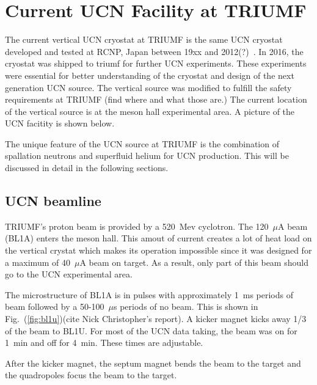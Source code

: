 \chapter{Current UCN Facility at TRIUMF}

The current vertical UCN cryostat at TRIUMF is the same UCN cryostat
developed and tested at RCNP, Japan between 19xx and
2012(?)~\cite{masuda2002spallation,masuda2012spallation}.  In 2016,
the cryostat was shipped to triumf for further UCN experiments. These
experiments were essential for better understanding of the cryostat
and design of the next generation UCN source.  The vertical source was
modified to fulfill the safety requirements at TRIUMF (find where and
what those are.)  The current location of the vertical source is at
the meson hall experimental area.  A picture of the UCN facitity is
shown below.

The unique feature of the UCN source at TRIUMF is the combination of
spallation neutrons and superfluid helium for UCN production. This
will be discussed in detail in the following sections.

\section{UCN beamline}
TRIUMF's proton beam is provided by a 520~Mev cyclotron. The
120~$\mu$A beam (BL1A) enters the meson hall. This amout of current
creates a lot of heat load on the vertical crystat which makes its
operation impossible since it was designed for a maximum of 40~$\mu$A
beam on target. As a result, only part of this beam should go to the UCN
experimental area.

The microstructure of BL1A is in pulses with approximately 1~ms
periods of beam followed by a 50-100~$\mu$s periods of no beam.  This
is shown in Fig.~(\ref{fig:bl1u})(cite Nick Christopher's report). A
kicker magnet kicks away 1/3 of the beam to BL1U. For most of the UCN
data taking, the beam was on for 1~min and off for 4~min. These times
are adjustable.

After the kicker magnet, the septum magnet bends the beam to the
target and the quadropoles focus the beam to the target.


